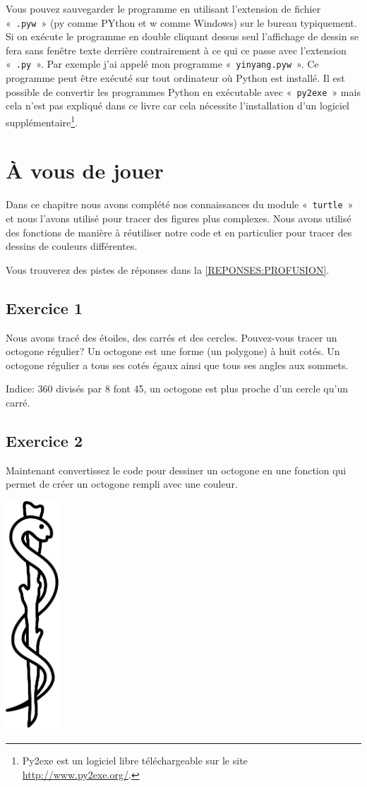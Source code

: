 Vous pouvez sauvegarder le programme en utilisant l'extension de fichier « \texttt{.pyw} » (py comme PYthon et w comme Windows) sur le bureau typiquement. Si on exécute le programme en double cliquant dessus seul l'affichage de dessin se fera sans fenêtre texte derrière contrairement à ce qui ce passe avec l'extension « \texttt{.py} ». Par exemple j'ai appelé mon programme « \texttt{yinyang.pyw} ». Ce programme peut être exécuté sur tout ordinateur où Python est installé. Il est possible de convertir les programmes Python en exécutable avec « \texttt{py2exe} » mais cela n'est pas expliqué dans ce livre car cela nécessite l'installation d'un logiciel supplémentaire\footnote{Py2exe est un logiciel libre téléchargeable sur le site \url{http://www.py2exe.org/}.}.


\section{À vous de jouer\label{PRATIQUE:PROFUSION}}

Dans ce chapitre nous avons complété nos connaissances du module « \texttt{turtle} » et nous l'avons utilisé pour tracer des figures plus complexes. Nous avons utilisé des fonctions de manière à réutiliser notre code et en particulier pour tracer des dessins de couleurs différentes.

Vous trouverez des pistes de réponses dans la \autoref{REPONSES:PROFUSION}.


\subsection{Exercice 1}
Nous avons tracé des étoiles, des carrés et des cercles. Pouvez-vous tracer un octogone régulier? Un octogone est une forme (un polygone) à huit cotés. Un octogone régulier a tous ses cotés égaux ainsi que tous ses angles aux sommets.

Indice: 360 divisés par 8 font 45, un octogone est plus proche d'un cercle qu'un carré.

\subsection{Exercice 2}
Maintenant convertissez le code pour dessiner un octogone en une fonction qui permet de créer un octogone rempli avec une couleur.


 \vfill
\begin{center}
 \includegraphics[width=2cm]{images/Esclapius_stick.pdf}
\end{center}
 \vfill

